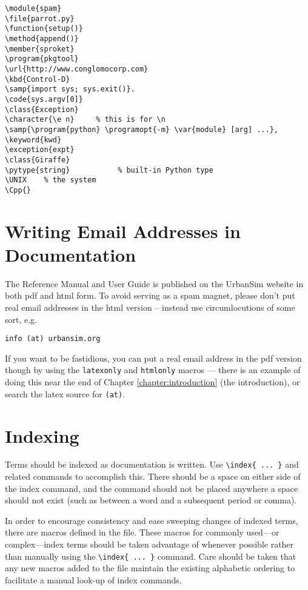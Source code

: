 \begin{verbatim}
\module{spam}
\file{parrot.py}
\function{setup()}
\method{append()}
\member{sproket}
\program{pkgtool}
\url{http://www.conglomocorp.com}
\kbd{Control-D}
\samp{import sys; sys.exit()}.
\code{sys.argv[0]}
\class{Exception}
\character{\e n}     % this is for \n
\samp{\program{python} \programopt{-m} \var{module} [arg] ...},
\keyword{kwd}
\exception{expt}
\class{Giraffe}
\pytype{string}           % built-in Python type
\UNIX    % the system
\Cpp{}
\end{verbatim}

\section{Writing Email Addresses in Documentation}

The Reference Manual and User Guide is published on the UrbanSim website in
both pdf and html form.  To avoid serving as a spam magnet, please don't put
real email addresses in the html version -- instead use circumlocutions of
some sort, e.g.\

\begin{verbatim}
info (at) urbansim.org
\end{verbatim}

If you want to be fastidious, you can put a real email address in the pdf version
though by using the {\tt latexonly} and {\tt htmlonly} macros --- there is an example
of doing this near the end of Chapter \ref{chapter:introduction} (the introduction),
or search the latex \latexindex source for {\tt (at)}.

\section{Indexing}

Terms should be indexed as documentation is written. Use \verb|\index{ ... }| and
related commands to accomplish this. There should be a space on either side of the
index command, and the command should not be placed anywhere a space should not exist
(such as between a word and a subsequent period or comma).

In order to encourage consistency and ease sweeping changes of indexed terms, there
are macros defined in the  file. These macros for commonly
used---or complex---index terms should be taken advantage of whenever possible
rather than manually using the \verb|\index{ ... }| command. Care should be taken
that any new macros added to the file maintain the existing alphabetic ordering
to facilitate a manual look-up of index commands.

